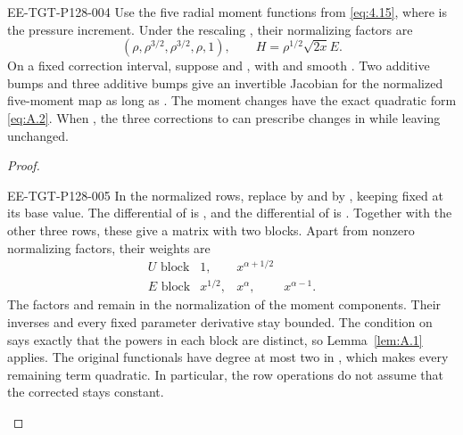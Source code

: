 \begin{corollary}\label{cor:A.3}
\begin{EESegment}{EE-TGT-P128-004}
Use the five radial moment functions  from
\eqref{eq:4.15}, where  is the pressure increment. Under the
rescaling , their normalizing factors are
\begin{equation}
(\rho,\rho^{3/2},\rho^{3/2},\rho,1),
\qquad H=\rho^{1/2}\sqrt{2x}E.
\tag{A.4}\label{eq:A.4}
\end{equation}
On a fixed correction interval, suppose
 and
, with
 and smooth . Two additive
 bumps and three additive  bumps give an
invertible Jacobian for the normalized five-moment map as long as
. The moment changes have the exact
quadratic form \eqref{eq:A.2}. When , the three corrections
to  can prescribe changes in
 while leaving  unchanged.
\end{EESegment}
\end{corollary}

\begin{proof}
\begin{EESegment}{EE-TGT-P128-005}
In the normalized rows, replace  by
 and  by
, keeping  fixed at its base
value. The differential of  is
, and the differential of
 is
. Together with the other three rows, these
give a matrix with two blocks. Apart from nonzero normalizing factors, their weights are
\[
\begin{array}{c|ccc}
U\text{ block}&1,&x^{\alpha+1/2}&\\
E\text{ block}&x^{1/2},&x^\alpha,&x^{\alpha-1}.
\end{array}
\]
The factors  and
 remain in the normalization of the moment components. Their
inverses and every fixed parameter derivative stay bounded. The condition on
 says exactly that the powers in each block are distinct, so
Lemma~\ref{lem:A.1} applies. The original functionals have degree at most two in
, which makes every remaining term quadratic. In particular,
the row operations do not assume that the corrected  stays
constant.
\end{EESegment}
\end{proof}

